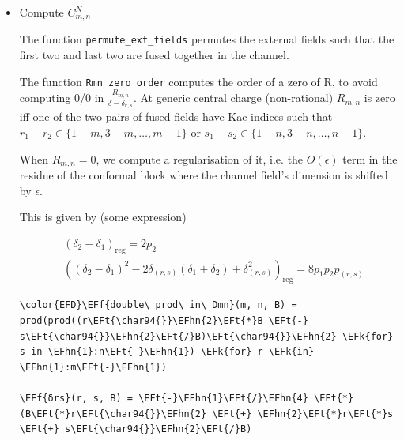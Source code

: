 \documentclass[a4paper]{article}
\numberwithin{equation}{section}
\newcommand{\EFc}[1]{\textcolor{EFc}{#1}} %
\newcommand{\EFcd}[1]{\textcolor{EFcd}{#1}} %
\newcommand{\EFs}[1]{\textcolor{EFs}{#1}} %
\newcommand{\EFk}[1]{\textcolor{EFk}{#1}} %
\newcommand{\EFf}[1]{\textcolor{EFf}{#1}} %
\newcommand{\EFv}[1]{\textcolor{EFv}{#1}} %
\newcommand{\EFt}[1]{\textcolor{EFt}{#1}} %
\newcommand{\EFhn}[1]{\textcolor{EFhn}{#1}} %
\begin{document}
\begin{itemize}
\begin{Code}
\begin{Verbatim}
\EFs{"""Display a four-point function"""}
\EFk{function} Base.\EFf{show}(io\EFt{::IO}, corr\EFt{::FourPointCorrelation})
    println(\EFs{"Four-point correlation function: < V\_1 V\_2 V\_3 V\_4 > where "})
    print(\EFs{"V\_1 = "}); show(corr.fields[\EFhn{1}])
    print(\EFs{"V\_2 = "}); show(corr.fields[\EFhn{2}])
    print(\EFs{"V\_3 = "}); show(corr.fields[\EFhn{3}])
    print(\EFs{"V\_4 = "}); show(corr.fields[\EFhn{4}])
\EFk{end}

\EFcd{\#} \EFc{explicit names for the indices of left and right dimensions}
\EFk{const} \EFv{left} = \EFhn{1}
\EFk{const} \EFv{right} = \EFhn{2}
\end{Verbatim}
\end{Code}
\item Compute \(C^N_{m,n}\)
\label{sec:org243d2aa}

The function \texttt{permute\_ext\_fields} permutes the external fields such that the first two and last two are fused together in the channel.

The function \texttt{Rmn\_zero\_order} computes the order of a zero of R, to avoid computing 0/0 in \(\frac{R_{m,n}}{\delta - \delta_{r,s}}\). At generic central charge (non-rational) \(R_{m,n}\) is zero iff one of the two pairs of fused fields have Kac indices such that \(r_1 \pm r_2 \in \{1-m, 3-m, \dots, m-1\}\) or \(s_1 \pm s_2 \in \{1-n, 3-n, \dots, n-1\}\).

When \(R_{m,n}=0\), we compute a regularisation of it, i.e. the \(O(\epsilon)\) term in the residue of the conformal block where the channel field's dimension is shifted by \(\epsilon\).

This is given by (some expression)

\begin{align}
&\left(\delta_2-\delta_1\right)_\text{reg} = 2p_2 \\
&\left((\delta_2-\delta_1)^2 -2\delta_{(r,s)}(\delta_1+\delta_2) + \delta_{(r,s)}^2\right)_\text{reg} = 8p_1p_2p_{(r,s)}
\end{align}

\begin{Code}
\begin{Verbatim}
\color{EFD}\EFf{double\_prod\_in\_Dmn}(m, n, B) = prod(prod((r\EFt{\char94{}}\EFhn{2}\EFt{*}B \EFt{-} s\EFt{\char94{}}\EFhn{2}\EFt{/}B)\EFt{\char94{}}\EFhn{2} \EFk{for} s in \EFhn{1}:n\EFt{-}\EFhn{1}) \EFk{for} r \EFk{in} \EFhn{1}:m\EFt{-}\EFhn{1})

\EFf{δrs}(r, s, B) = \EFt{-}\EFhn{1}\EFt{/}\EFhn{4} \EFt{*} (B\EFt{*}r\EFt{\char94{}}\EFhn{2} \EFt{+} \EFhn{2}\EFt{*}r\EFt{*}s \EFt{+} s\EFt{\char94{}}\EFhn{2}\EFt{/}B)


\end{Verbatim}
\end{Code}
\end{itemize}
\end{document}
